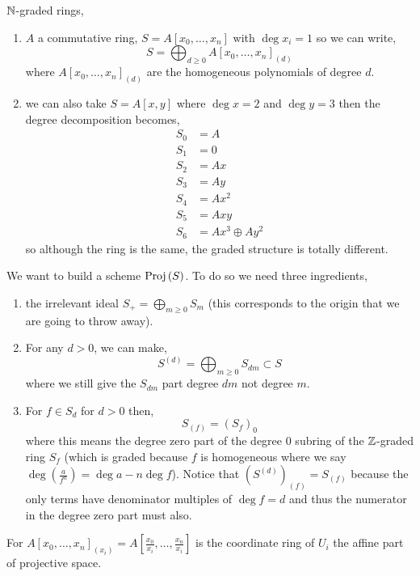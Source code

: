 \documentclass[12pt]{article}
\begin{document}
\begin{example}
$\mathbb{N}$-graded rings,
\begin{enumerate}
\item $A$ a commutative ring, $S = A[x_0, \dots, x_n]$ with $\deg{x_i} = 1$ so we can write,
\[ S = \bigoplus_{d \ge 0} A[x_0, \dots, x_n]_{(d)} \]
where $A[x_0, \dots, x_n]_{(d)}$ are the homogeneous polynomials of degree $d$.
\item we can also take $S = A[x,y]$ where $\deg{x} = 2$ and $\deg{y} = 3$ then the degree decomposition becomes,
\begin{align*}
S_0 & = A
\\
S_1 & = 0
\\
S_2 & = A x
\\
S_3 & = A y
\\
S_4 & = A x^2
\\
S_5 & = A xy
\\
S_6 & = A x^3 \oplus A y^2
\end{align*}
so although the ring is the same, the graded structure is totally different.
\end{enumerate}
\end{example}

\begin{rmk}
We want to build a scheme $\mathrm{Proj}\left( S \right)$. To do so we need three ingredients,
\begin{enumerate}
\item the irrelevant ideal $S_+ = \bigoplus\limits_{m \ge 0} S_m$ (this corresponds to the origin that we are going to throw away).
\item For any $d > 0$, we can make,
\[ S^{(d)} = \bigoplus_{m \ge 0} S_{dm} \subset S \]
where we still give the $S_{dm}$ part degree $dm$ not degree $m$.
\item For $f \in S_d$ for $d > 0$ then,
\[ S_{(f)} = (S_f)_0 \]
where this means the degree zero part of the degree $0$ subring of the $\mathbb{Z}$-graded ring $S_f$ (which is graded because $f$ is homogeneous where we say $\deg{\left( \frac{a}{f^n} \right)} = \deg{a} - n\deg{f}$). Notice that $(S^{(d)})_{(f)} = S_{(f)}$ because the only terms have denominator multiples of $\deg{f} = d$ and thus the numerator in the degree zero part must also. 
\end{enumerate}
\end{rmk}

\begin{example}
For $A[x_0, \dots, x_n]_{(x_i)} = A[\frac{x_0}{x_i}, \dots, \frac{x_n}{x_i}]$ is the coordinate ring of $U_i$ the affine part of projective space.
\end{example}
\end{document}
